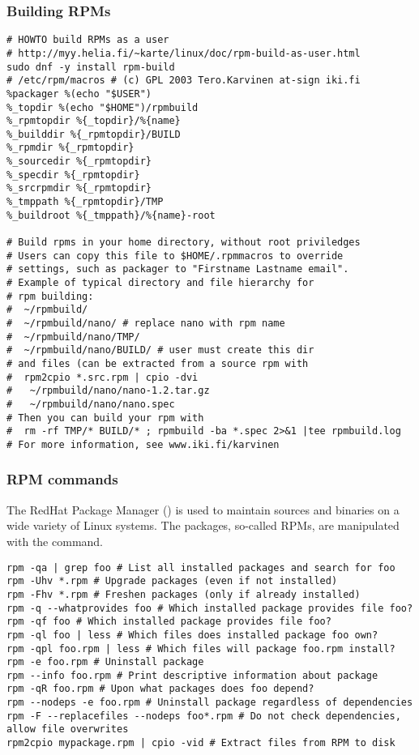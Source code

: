 \documentclass[12pt,twoside]{article}
\begin{document}
\subsubsection{Building RPMs}\label{sxn:rpmbld}
\begin{verbatim}
# HOWTO build RPMs as a user
# http://myy.helia.fi/~karte/linux/doc/rpm-build-as-user.html
sudo dnf -y install rpm-build
# /etc/rpm/macros # (c) GPL 2003 Tero.Karvinen at-sign iki.fi
%packager %(echo "$USER")
%_topdir %(echo "$HOME")/rpmbuild
%_rpmtopdir %{_topdir}/%{name}
%_builddir %{_rpmtopdir}/BUILD
%_rpmdir %{_rpmtopdir}
%_sourcedir %{_rpmtopdir}
%_specdir %{_rpmtopdir}
%_srcrpmdir %{_rpmtopdir}
%_tmppath %{_rpmtopdir}/TMP
%_buildroot %{_tmppath}/%{name}-root

# Build rpms in your home directory, without root priviledges
# Users can copy this file to $HOME/.rpmmacros to override
# settings, such as packager to "Firstname Lastname email".
# Example of typical directory and file hierarchy for
# rpm building:
#  ~/rpmbuild/
#  ~/rpmbuild/nano/ # replace nano with rpm name
#  ~/rpmbuild/nano/TMP/
#  ~/rpmbuild/nano/BUILD/ # user must create this dir
# and files (can be extracted from a source rpm with
#  rpm2cpio *.src.rpm | cpio -dvi
#   ~/rpmbuild/nano/nano-1.2.tar.gz
#   ~/rpmbuild/nano/nano.spec
# Then you can build your rpm with
#  rm -rf TMP/* BUILD/* ; rpmbuild -ba *.spec 2>&1 |tee rpmbuild.log
# For more information, see www.iki.fi/karvinen
\end{verbatim}

\subsubsection{RPM commands}\label{sxn:rpm}
The RedHat Package Manager () is used to maintain sources
and binaries on a wide variety of Linux systems.
The packages, so-called RPMs, are manipulated with the 
command. 
\begin{verbatim}
rpm -qa | grep foo # List all installed packages and search for foo
rpm -Uhv *.rpm # Upgrade packages (even if not installed)
rpm -Fhv *.rpm # Freshen packages (only if already installed)
rpm -q --whatprovides foo # Which installed package provides file foo?
rpm -qf foo # Which installed package provides file foo?
rpm -ql foo | less # Which files does installed package foo own?
rpm -qpl foo.rpm | less # Which files will package foo.rpm install?
rpm -e foo.rpm # Uninstall package
rpm --info foo.rpm # Print descriptive information about package
rpm -qR foo.rpm # Upon what packages does foo depend?
rpm --nodeps -e foo.rpm # Uninstall package regardless of dependencies
rpm -F --replacefiles --nodeps foo*.rpm # Do not check dependencies, allow file overwrites
rpm2cpio mypackage.rpm | cpio -vid # Extract files from RPM to disk
\end{verbatim}
\end{document}
